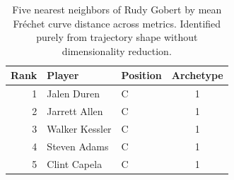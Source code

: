 \begin{table}[htbp]
  \centering\small
  \begin{tabular}{rllc}
    \toprule
    Rank & Player & Position & Archetype \\
    \midrule
    1 & Jalen Duren & C & 1 \\
    2 & Jarrett Allen & C & 1 \\
    3 & Walker Kessler & C & 1 \\
    4 & Steven Adams & C & 1 \\
    5 & Clint Capela & C & 1 \\
    \bottomrule
  \end{tabular}
  \caption{Five nearest neighbors of Rudy Gobert by mean Fr\'{e}chet curve distance across metrics. Identified purely from trajectory shape without dimensionality reduction.}
  \label{tab:Rudy_Gobert_frechet_curve_neighbors}
\end{table}

